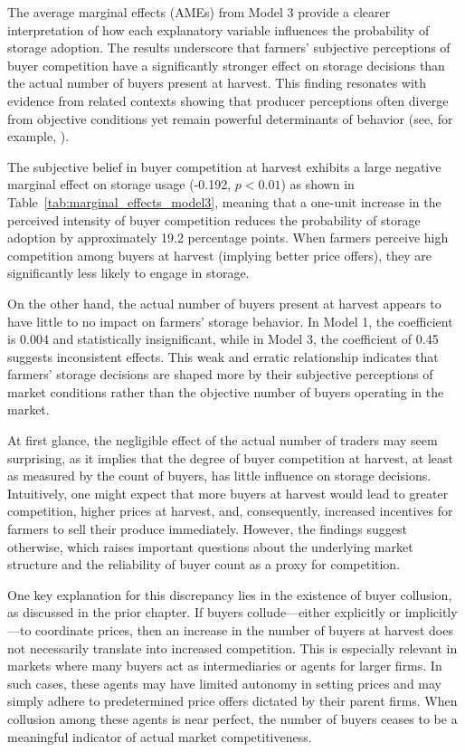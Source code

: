 


The average marginal effects (AMEs) from Model 3 provide a clearer interpretation of how each explanatory variable influences the probability of storage adoption. The results underscore that farmers' subjective perceptions of buyer competition have a significantly stronger effect on storage decisions than the actual number of buyers present at harvest. This finding resonates with evidence from related contexts showing that producer perceptions often diverge from objective conditions yet remain powerful determinants of behavior (see, for example, \citet{goodrich2025rainfall}).

The subjective belief in buyer competition at harvest exhibits a large negative marginal effect on storage usage (-0.192, $p<0.01$) as shown in Table~\ref{tab:marginal_effects_model3}, meaning that a one-unit increase in the perceived intensity of buyer competition reduces the probability of storage adoption by approximately 19.2 percentage points. When farmers perceive high competition among buyers at harvest (implying better price offers), they are significantly less likely to engage in storage.  

On the other hand, the actual number of buyers present at harvest appears to have little to no impact on farmers' storage behavior. In Model 1, the coefficient is 0.004 and statistically insignificant, while in Model 3, the coefficient of 0.45 suggests inconsistent effects. This weak and erratic relationship indicates that farmers' storage decisions are shaped more by their subjective perceptions of market conditions rather than the objective number of buyers operating in the market.

At first glance, the negligible effect of the actual number of traders may seem surprising, as it implies that the degree of buyer competition at harvest, at least as measured by the count of buyers, has little influence on storage decisions. Intuitively, one might expect that more buyers at harvest would lead to greater competition, higher prices at harvest, and, consequently, increased incentives for farmers to sell their produce immediately. However, the findings suggest otherwise, which raises important questions about the underlying market structure and the reliability of buyer count as a proxy for competition.

One key explanation for this discrepancy lies in the existence of buyer collusion, as discussed in the prior chapter. If buyers collude---either explicitly or implicitly---to coordinate prices, then an increase in the number of buyers at harvest does not necessarily translate into increased competition. This is especially relevant in markets where many buyers act as intermediaries or agents for larger firms. In such cases, these agents may have limited autonomy in setting prices and may simply adhere to predetermined price offers dictated by their parent firms. When collusion among these agents is near perfect, the number of buyers ceases to be a meaningful indicator of actual market competitiveness.

